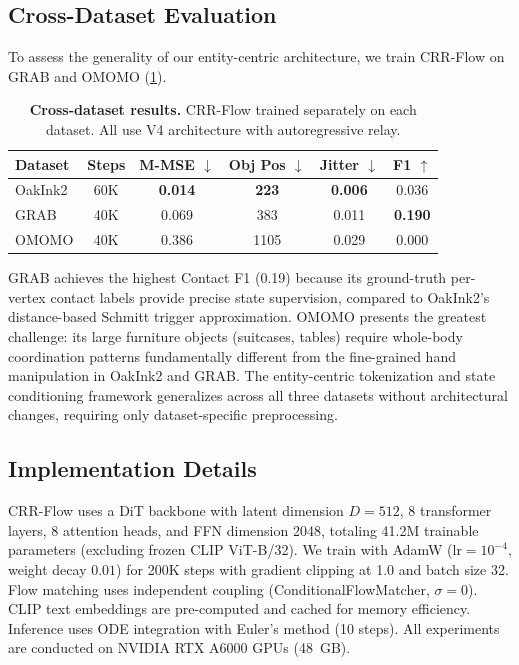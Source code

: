 \subsection{Cross-Dataset Evaluation}
\label{sec:cross_dataset}

To assess the generality of our entity-centric architecture, we train CRR-Flow on GRAB and OMOMO (\cref{tab:cross_dataset}).

\begin{table}[t]
  \caption{\textbf{Cross-dataset results.} CRR-Flow trained separately on each dataset. All use V4 architecture with autoregressive relay.}
  \label{tab:cross_dataset}
  \centering
  \small
  \begin{tabular}{@{}lccccc@{}}
    \toprule
    Dataset & Steps & M-MSE $\downarrow$ & Obj Pos $\downarrow$ & Jitter $\downarrow$ & F1 $\uparrow$ \\
    \midrule
    OakInk2 & 60K & \textbf{0.014} & \textbf{223} & \textbf{0.006} & 0.036 \\
    GRAB & 40K & 0.069 & 383 & 0.011 & \textbf{0.190} \\
    OMOMO & 40K & 0.386 & 1105 & 0.029 & 0.000 \\
    \bottomrule
  \end{tabular}
\end{table}

GRAB achieves the highest Contact F1 (0.19) because its ground-truth per-vertex contact labels provide precise state supervision, compared to OakInk2's distance-based Schmitt trigger approximation.
OMOMO presents the greatest challenge: its large furniture objects (suitcases, tables) require whole-body coordination patterns fundamentally different from the fine-grained hand manipulation in OakInk2 and GRAB.
The entity-centric tokenization and state conditioning framework generalizes across all three datasets without architectural changes, requiring only dataset-specific preprocessing.


\subsection{Implementation Details}
\label{sec:implementation}

CRR-Flow uses a DiT backbone with latent dimension $D{=}512$, 8 transformer layers, 8 attention heads, and FFN dimension 2048, totaling 41.2M trainable parameters (excluding frozen CLIP ViT-B/32).
We train with AdamW ($\text{lr}{=}10^{-4}$, weight decay $0.01$) for 200K steps with gradient clipping at 1.0 and batch size 32.
Flow matching uses independent coupling (ConditionalFlowMatcher, $\sigma{=}0$).
CLIP text embeddings are pre-computed and cached for memory efficiency.
Inference uses ODE integration with Euler's method (10 steps).
All experiments are conducted on NVIDIA RTX A6000 GPUs (48~GB).
